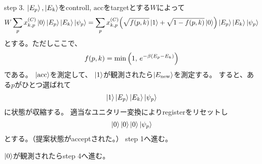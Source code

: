 \documentclass[]{ltjsarticle}
\begin{document}
step 3.
$\ket{E_p}, \ket{E_k}$をcontroll,
$\text{acc}$をtargetとする$W$によって
\begin{align}
    W
    \sum_p x_{k,p}^{(C)}
    \ket{0}
    \ket{E_p}
    \ket{E_k}
    \ket{\psi_p}
    =
    \sum_p x_{k,p}^{(C)}
    \qty(
        \sqrt{f(p,k)}\ket{1}
        +
        \sqrt{1-f(p,k)}\ket{0}
    )
    \ket{E_p}
    \ket{E_k}
    \ket{\psi_p}
\end{align}
とする。ただしここで、
\begin{align}
    f(p,k)
    =
    \min\qty(1, \, e^{-\beta(E_p-E_k)})
\end{align}
である。
$\ket{\text{acc}}$を測定して、
$\ket{1}$が観測されたら$\ket{E_\text{new}}$を測定する。
すると、ある$p$がひとつ選ばれて
\begin{align}
    \ket{1}
    \ket{E_p}
    \ket{E_k}
    \ket{\psi_p}
\end{align}
に状態が収縮する。
適当なユニタリー変換によりregisterをリセットし
\begin{align}
    \ket{0}
    \ket{0}
    \ket{0}
    \ket{\psi_p}
\end{align}
とする。（提案状態がacceptされた。）
step 1へ進む。

$\ket{0}$が観測されたらstep 4へ進む。
\end{document}
